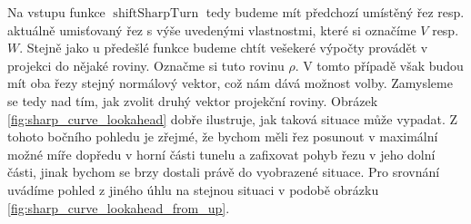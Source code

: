 Na vstupu funkce $ \operatorname{shiftSharpTurn} $ tedy budeme mít předchozí
umístěný řez resp. aktuálně umisťovaný řez s výše uvedenými vlastnostmi,
které si označíme $ V $
resp. $ W $. Stejně jako u předešlé funkce budeme chtít vešekeré výpočty provádět
v projekci do nějaké roviny. Označme si tuto rovinu $ \rho $.
V tomto případě však budou mít oba řezy stejný
normálový vektor, což nám dává možnost volby. Zamysleme se tedy nad tím,
jak zvolit druhý vektor projekční roviny. Obrázek \ref{fig:sharp_curve_lookahead}
dobře ilustruje, jak taková situace může vypadat. Z tohoto bočního pohledu je
zřejmé, že bychom měli řez posunout v maximální možné míře dopředu v horní části
tunelu a zafixovat pohyb řezu v jeho dolní části, jinak bychom se brzy dostali
právě do vyobrazené situace. Pro srovnání uvádíme pohled z jiného úhlu na stejnou
situaci v podobě obrázku \ref{fig:sharp_curve_lookahead_from_up}.


